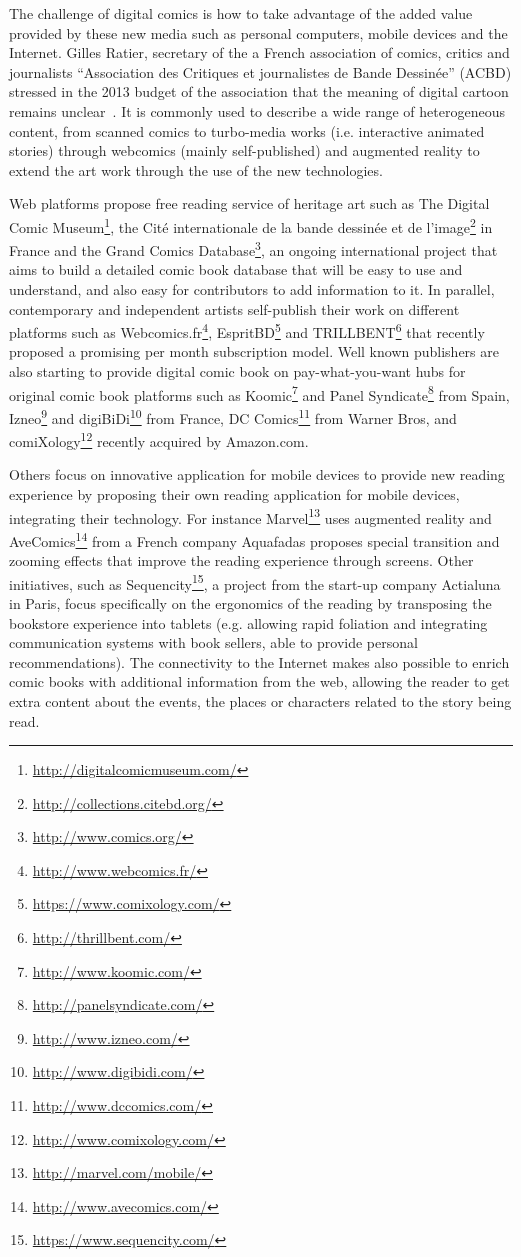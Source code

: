 The challenge of digital comics is how to take advantage of the added value provided by these new media such as personal computers, mobile devices and the Internet.
Gilles Ratier, secretary of the a French association of comics, critics and journalists ``Association des Critiques et journalistes de Bande Dessin\'{e}e'' (ACBD) stressed in the 2013 budget of the association that the meaning of digital cartoon remains unclear~\cite{Ratier2013}.
It is commonly used to describe a wide range of heterogeneous content, from scanned comics to turbo-media works (i.e. interactive animated stories) through webcomics (mainly self-published) and augmented reality to extend the art work through the use of the new technologies.

Web platforms propose free reading service of heritage art such as The Digital Comic Museum\footnote{\url{http://digitalcomicmuseum.com/}}, the Cit\'{e} internationale de la bande dessin\'{e}e et de l'image\footnote{\url{http://collections.citebd.org/}} in France and the Grand Comics Database\footnote{\url{http://www.comics.org/}}, an ongoing international project that aims to build a detailed comic book database that will be easy to use and understand, and also easy for contributors to add information to it.
In parallel, contemporary and independent artists self-publish their work on different platforms such as Webcomics.fr\footnote{\url{http://www.webcomics.fr/}}, EspritBD\footnote{\url{https://www.comixology.com/}} and TRILLBENT\footnote{\url{http://thrillbent.com/}} that recently proposed a promising per month subscription model.
Well known publishers are also starting to provide digital comic book on pay-what-you-want hubs for original comic book platforms such as Koomic\footnote{\url{http://www.koomic.com/}} and Panel Syndicate\footnote{\url{http://panelsyndicate.com/}} from Spain, Izneo\footnote{\url{http://www.izneo.com/}} and digiBiDi\footnote{\url{http://www.digibidi.com/}} from France, DC Comics\footnote{\url{http://www.dccomics.com/}} from Warner Bros, and comiXology\footnote{\url{http://www.comixology.com/}} recently acquired by Amazon.com.

Others focus on innovative application for mobile devices to provide new reading experience by proposing their own reading application for mobile devices, integrating their technology.
For instance Marvel\footnote{\url{http://marvel.com/mobile/}} uses augmented reality and AveComics\footnote{\url{http://www.avecomics.com/}} from a French company Aquafadas proposes special transition and zooming effects that improve the reading experience through screens.
Other initiatives, such as Sequencity\footnote{\url{https://www.sequencity.com/}}, a project from the start-up company Actialuna in Paris, focus specifically on the ergonomics of the reading by transposing the bookstore experience into tablets (e.g. allowing rapid foliation and integrating communication systems with book sellers, able to provide personal recommendations).
The connectivity to the Internet makes also possible to enrich comic books with additional information from the web,
allowing the reader to get extra content about the events, the places or characters related to the story being read.

